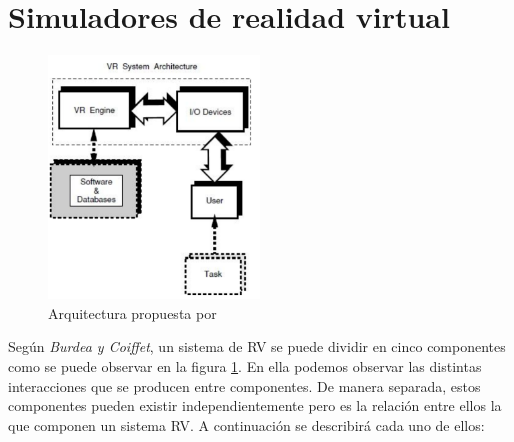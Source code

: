 \section{Simuladores de realidad virtual}
\label{art:simulador}

\begin{figure}[h]
   \centering
    \includegraphics[width=0.5\textwidth]{IMG/VRarq.PNG}
    \caption{Arquitectura propuesta por \cite{burdea2003virtual} }
   \label{fig:RVarq}
\end{figure}
Según \emph{Burdea y Coiffet}\cite{burdea2003virtual}, un sistema de \ac{RV} se puede dividir en cinco componentes como se puede observar en la figura \ref{fig:RVarq}. En ella podemos observar las distintas interacciones que se producen entre componentes. De manera separada, estos componentes pueden existir independientemente pero es la relación entre ellos la que componen un sistema \ac{RV}. A continuación se describirá cada uno de ellos:
